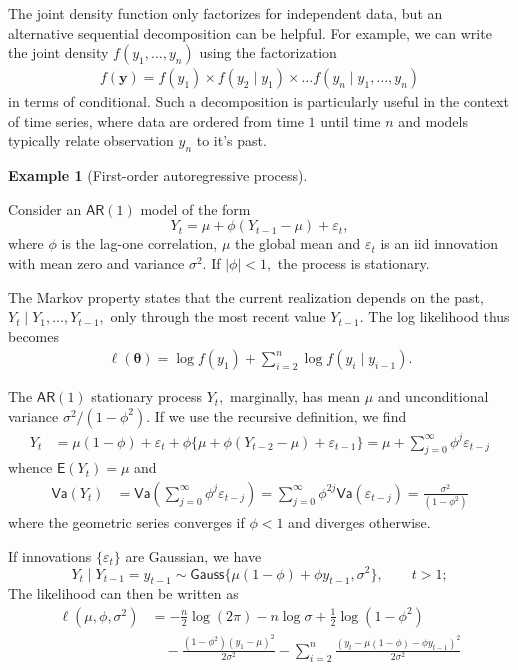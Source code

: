 \documentclass[
  11pt,
  letterpaper,
]{scrbook}
\theoremstyle{definition}
\newtheorem{example}{Example}[chapter]
\theoremstyle{plain}
\theoremstyle{plain}
\theoremstyle{plain}
\theoremstyle{definition}
\theoremstyle{definition}
\theoremstyle{plain}
\theoremstyle{plain}
\theoremstyle{remark}
\begin{document}
The joint density function only factorizes for independent data, but an
alternative sequential decomposition can be helpful. For example, we can
write the joint density \(f(y_1, \ldots, y_n)\) using the factorization
\begin{align*}
f(\boldsymbol{y}) = f(y_1) \times f(y_2 \mid y_1) \times \ldots f(y_n \mid y_1, \ldots, y_n)
\end{align*} in terms of conditional. Such a decomposition is
particularly useful in the context of time series, where data are
ordered from time \(1\) until time \(n\) and models typically relate
observation \(y_n\) to it's past.

\begin{example}[First-order autoregressive
process]\protect\hypertarget{exm-autoregressive-one}{}\label{exm-autoregressive-one}

Consider an \(\mathsf{AR}(1)\) model of the form
\[Y_t = \mu + \phi(Y_{t-1} - \mu) + \varepsilon_t,\] where \(\phi\) is
the lag-one correlation, \(\mu\) the global mean and \(\varepsilon_t\)
is an iid innovation with mean zero and variance \(\sigma^2.\) If
\(|\phi| < 1,\) the process is stationary.

The Markov property states that the current realization depends on the
past, \(Y_t \mid Y_1, \ldots, Y_{t-1},\) only through the most recent
value \(Y_{t-1}.\) The log likelihood thus becomes \begin{align*}
\ell(\boldsymbol{\theta}) = \log f(y_1) + \sum_{i=2}^n \log f(y_i \mid y_{i-1}).
\end{align*}

The \(\mathsf{AR}(1)\) stationary process \(Y_t,\) marginally, has mean
\(\mu\) and unconditional variance \(\sigma^2/(1-\phi^2).\) If we use
the recursive definition, we find \begin{align*}
Y_t &= \mu (1-\phi) + \varepsilon_t + \phi \{\mu + \phi(Y_{t-2}-\mu) + \varepsilon_{t-1}\}
= \mu + \sum_{j=0}^\infty \phi^j\varepsilon_{t-j}
\end{align*} whence \(\mathsf{E}(Y_t) = \mu\) and \begin{align*}
\mathsf{Va}(Y_t) &= \mathsf{Va}\left(\sum_{j=0}^\infty \phi^j\varepsilon_{t-j}\right)
= \sum_{j=0}^\infty \phi^{2j} \mathsf{Va}(\varepsilon_{t-j})
=\frac{\sigma^2}{(1-\phi^2)}
\end{align*} where the geometric series converges if \(\phi<1\) and
diverges otherwise.

If innovations \(\{\varepsilon_t\}\) are Gaussian, we have
\[Y_t \mid Y_{t-1}=y_{t-1} \sim \mathsf{Gauss}\{\mu(1-\phi)+ \phi y_{t-1}, \sigma^2\}, \qquad t>1;\]
The likelihood can then be written as \begin{align*}
\ell(\mu, \phi,\sigma^2)& = -\frac{n}{2}\log(2\pi) - n\log \sigma + \frac{1}{2}\log(1-\phi^2) \\&\quad -\frac{(1-\phi^2)(y_1- \mu)^2}{2\sigma^2} - \sum_{i=2}^n \frac{(y_t - \mu(1-\phi)- \phi y_{t-1})^2}{2\sigma^2}
\end{align*}

\end{example}
\end{document}
